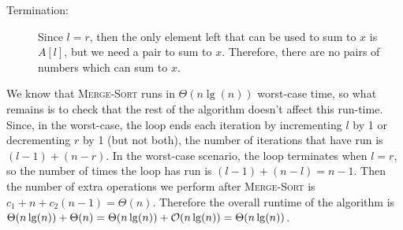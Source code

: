 \documentclass[Chapter02]{subfiles}
\begin{document}
\begin{enumerate}[leftmargin=\labelsep]
\begin{answer}
\begin{description}
				\item[Termination:] Since $l = r$, then the only element left that can be used to sum to $x$ is $A[l]$, but we need a pair to sum to $x$. Therefore, there are no pairs of numbers which can sum to $x$.
			\end{description}

			We know that \textsc{Merge-Sort} runs in $\Theta(n \lg(n))$ worst-case time, so what remains is to check that the rest of the algorithm doesn't affect this run-time. Since, in the worst-case, the loop ends each iteration by incrementing $l$ by 1 or decrementing $r$ by 1 (but not both), the number of iterations that have run is $(l - 1) + (n - r)$. In the worst-case scenario, the loop terminates when $l = r$, so the number of times the loop has run is $(l - 1) + (n - l) = n - 1$. Then the number of extra operations we perform after \textsc{Merge-Sort} is $c_1 + n + c_2(n - 1) = \Theta(n)$. Therefore the overall runtime of the algorithm is $\Theta(n\lg(n)) + \Theta(n) = \Theta(n \lg(n)) + \mathcal{O}(n \lg(n)) = \Theta(n \lg(n))$.
		\end{answer}

	\end{enumerate}
\end{document}
